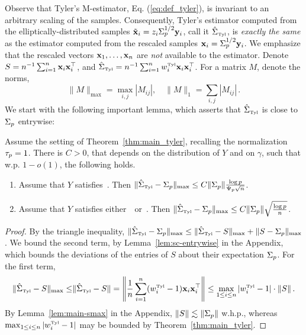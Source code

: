 \documentclass[times,sort&compress,3p]{elsarticle}
\newcommand{\Revision}[1]{{#1}}
\begin{document}
Observe that Tyler's M-estimator, Eq. (\ref{eq:def_tyler}),  is invariant to an arbitrary scaling of the samples. Consequently, Tyler's estimator computed from the elliptically-distributed samples $\tilde{{\bf x}}_i=z_i\Sigma_p^{1/2}{\bf y}_i$, call it $\hat{\Sigma}_{\mbox{\tiny{Tyl}}}$, is \emph{exactly the same} as the estimator computed from the rescaled samples ${\bf x}_i=\Sigma_p^{1/2}{\bf y}_i$. We emphasize that the rescaled vectors ${\bf x}_1,\ldots,{\bf x}_n$ are \emph{not}  available to the estimator.
Denote $S=n^{-1}\sum_{i=1}^n {\bf x}_i{\bf x}_i^\top$, and $\hat{\Sigma}_{\mbox{\tiny{Tyl}}} = n^{-1}\sum_{i=1}^n w^{\mbox{\tiny{Tyl}}}_i {\bf x}_i{\bf x}_i^\top$. For a matrix $M$, denote the norms,
\[
\|M\|_{\max} = \max_{i,j}|M_{ij}|,\quad \|M\|_{1}=\sum_{i,j}|M_{ij}| \,.    
\]
We start with the following important lemma, which asserts that $\hat{\Sigma}_{\mbox{\tiny{Tyl}}}$ is close to $\Sigma_p$ entrywise:
\begin{lemma}\label{lem:cov-estimation-application}
    Assume the setting of Theorem~\ref{thm:main_tyler}, recalling the normalization $\tau_p=1$. There is $C>0$, that depends on the distribution of $Y$ and on $\gamma$, such that w.p. $1-o(1)$, the following holds. 
    \begin{enumerate}
        \item 
        Assume that $Y$ satisfies~\AssumLC. Then
        $\|\hat{\Sigma}_{\mbox{\tiny{Tyl}}}-\Sigma_p\|_{\max} \le C\|\Sigma_p\|\frac{\log p}{\Psi_p\sqrt{n}}$.
        \item 
        Assume that $Y$ satisfies either~\AssumIndep~or~\AssumCCPSB. Then
        $\|\hat{\Sigma}_{\mbox{\tiny{Tyl}}}-\Sigma_p\|_{\max} \le C\|\Sigma_p\|\sqrt{\frac{\log p}{n}}$.
    \end{enumerate}
\end{lemma}
\begin{proof}
    By the triangle inequality, $\|\hat{\Sigma}_{\mbox{\tiny{Tyl}}}-\Sigma_p\|_{\max} \le \|\hat{\Sigma}_{\mbox{\tiny{Tyl}}}-S\|_{\max} + \|S-\Sigma_p\|_{\max}$. We bound the second term, by  Lemma~\ref{lem:sc-entrywise} in the Appendix, which bounds the deviations of the entries of $S$ about their expectation $\Sigma_p$. For the first term, 
    \[
    \Revision{ \|\SigmaTyl-S\|_{\max} \le   } 
    \|\SigmaTyl-S\| = \left\| \frac1n\sum_{i=1}^n (\wTyl_i-1)\x_i\x_i^\T  \right\| \le \max_{1\le i \le n} |\wTyl_i-1|\cdot \|S\| \,.  
    \]
    By  Lemma~\ref{lem:main-smax} in the Appendix, $\|S\| \lesssim \|\Sigma_p\|$ w.h.p., whereas $\max_{1\le i \le n} |w^{\mbox{\tiny{Tyl}}}_i-1|$ may be bounded by Theorem~\ref{thm:main_tyler}.
\end{proof}
\end{document}
